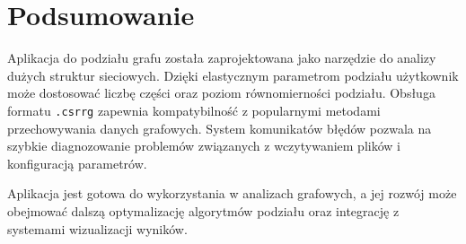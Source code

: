\documentclass{article}
\begin{document}
\section{Podsumowanie}
Aplikacja do podziału grafu została zaprojektowana jako narzędzie do analizy dużych struktur sieciowych. Dzięki elastycznym parametrom podziału użytkownik może dostosować liczbę części oraz poziom równomierności podziału. Obsługa formatu \texttt{.csrrg} zapewnia kompatybilność z popularnymi metodami przechowywania danych grafowych. System komunikatów błędów pozwala na szybkie diagnozowanie problemów związanych z wczytywaniem plików i konfiguracją parametrów. 

Aplikacja jest gotowa do wykorzystania w analizach grafowych, a jej rozwój może obejmować dalszą optymalizację algorytmów podziału oraz integrację z systemami wizualizacji wyników. 
\end{document}
